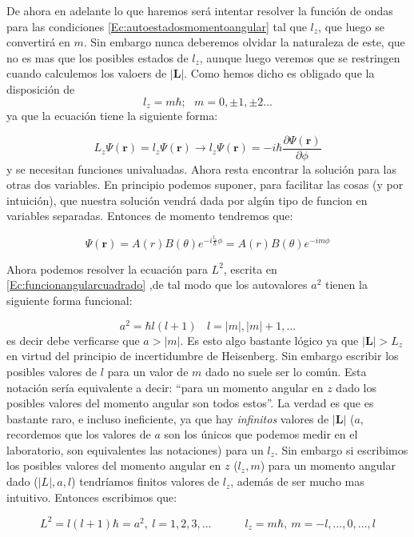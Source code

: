 \documentclass[12pt,a4paper]{article}
\numberwithin{equation}{section}
\numberwithin{figure}{section}
\newcommand{\parciales}[2]{\frac{\partial #1}{\partial #2}}
\newcommand{\tquad}{\quad \quad \quad}
\newcommand{\rn}{\mathbf{r}}
\newcommand{\Ln}{\mathbf{L}}
\begin{document}
De ahora en adelante lo que haremos será intentar resolver la función de ondas para las condiciones \ref{Ec:autoestadosmomentoangular} tal que $l_z$, que luego se convertirá en $m$. Sin embargo nunca deberemos olvidar la naturaleza de este, que no es mas que los posibles estados de $l_z$, aunque luego veremos que se restringen cuando calculemos los valoers de $|\Ln|$.  Como hemos dicho es obligado que la disposición de $$l_z = m \hbar; \ \ \ m = 0, \pm 1, \pm 2 ...$$ ya que la ecuación tiene la siguiente forma:


$$L_z \Psi (\rn) = l_z \Psi (\rn) \longrightarrow l_z \Psi (\rn) = - i \hbar \parciales{\Psi (\rn)}{\phi}  $$
y se necesitan funciones univaluadas. Ahora resta encontrar la solución para las otras dos variables. En principio podemos suponer, para facilitar las cosas (y por intuición), que nuestra solución vendrá dada por algún tipo de funcion en variables separadas. Entonces de momento tendremos que:

$$\Psi (\rn) = A(r) B(\theta) e^{-i \frac{l_z}{\hbar} \phi} = A(r) B (\theta) e^{-im \phi}$$

Ahora podemos resolver la ecuación para $L^2$, escrita en \ref{Ec:funcionangularcuadrado} ,de tal modo que los autovalores $a^2$ tienen la siguiente forma funcional:

\begin{equation}
a^2 = \hbar l(l+1) \ \ \ \ l = |m|, |m|+1,...
\end{equation}
es decir debe verficarse que $a>|m|$. Es esto algo bastante lógico ya que $|\Ln| > L_z$ en virtud del principio de incertidumbre de Heisenberg. Sin embargo escribir los posibles valores de $l$ para un valor de $m$ dado no suele ser lo común. Esta notación sería equivalente a decir: ``para un momento angular en $z$ dado los posibles valores del momento angular son todos estos''. La verdad es que es bastante raro, e incluso ineficiente, ya que hay \textit{infinitos} valores de $|\Ln|$ ($a$, recordemos que los valores de $a$ son los únicos que podemos medir en el laboratorio, son equivalentes las notaciones) para un $l_z$. Sin embargo si escribimos los posibles valores del momento angular en $z$ ($l_z, m$) para un momento angular dado ($|L|,a,l$) tendríamos finitos valores de $l_z$, además de ser mucho mas intuitivo. Entonces escribimos que:

\begin{equation}
L^2 = l(l+1) \hbar = a^2, \ l = 1,2,3,\ldots \tquad l_z = m\hbar, \ m = -l,\ldots,0,\ldots,l
\end{equation}
\end{document}

